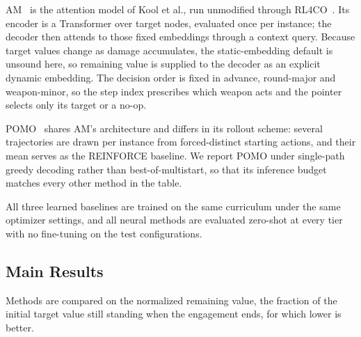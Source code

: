 AM~\cite{kool2018attention} is the attention model of Kool et al., run
unmodified through RL4CO~\cite{berto2023rl4co}. Its encoder is a Transformer
over target nodes, evaluated once per instance; the decoder then attends to
those fixed embeddings through a context query. Because target values change
as damage accumulates, the static-embedding default is unsound here, so
remaining value is supplied to the decoder as an explicit dynamic embedding.
The decision order is fixed in advance, round-major and weapon-minor, so the
step index prescribes which weapon acts and the pointer selects only its
target or a no-op.

POMO~\cite{kwon2020pomo} shares AM's architecture and differs in its rollout
scheme: several trajectories are drawn per instance from forced-distinct
starting actions, and their mean serves as the REINFORCE baseline. We report
POMO under single-path greedy decoding rather than best-of-multistart, so that
its inference budget matches every other method in the table.

All three learned baselines are trained on the same curriculum under the same
optimizer settings, and all neural methods are evaluated zero-shot at every
tier with no fine-tuning on the test configurations.

\subsection{Main Results}
\label{sec:main-results}

Methods are compared on the normalized remaining value, the fraction of the
initial target value still standing when the engagement ends, for which lower
is better.

